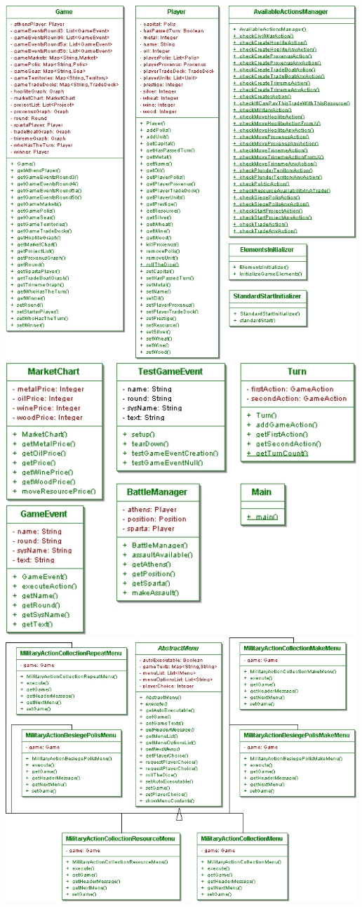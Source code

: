 \documentclass[11 pt]{book}
\begin{document}
\begin{center}
		    \includegraphics[width=500px]{design-uml/iteration7/game player y otros.jpg}
		    \includegraphics[width=500px]{design-uml/iteration7/main y otros.jpg}
		    \includegraphics[width=500px]{design-uml/iteration7/militaryactions1.jpg}

\end{center}
\end{document}
